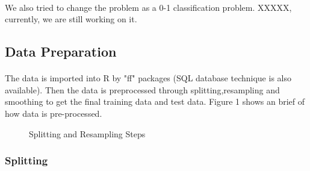 \documentclass{article}
\begin{document}
	\paragraph{} We also tried to change the problem as a 0-1 classification problem. XXXXX, currently, we are still working on it. 
	
		\subsection{Data Preparation} %
		\label{sub:idea}
		\paragraph{} The data is imported into R by "ff" packages (SQL database technique is also available). Then the data is preprocessed through splitting,resampling and smoothing to get the final training data and test data. Figure 1 shows an brief of how data is pre-processed.
		
		\begin{figure}
			\centering
			\caption{Splitting and Resampling Steps}
		\end{figure}
		
		
		
		 \subsubsection{Splitting}
\end{document}

